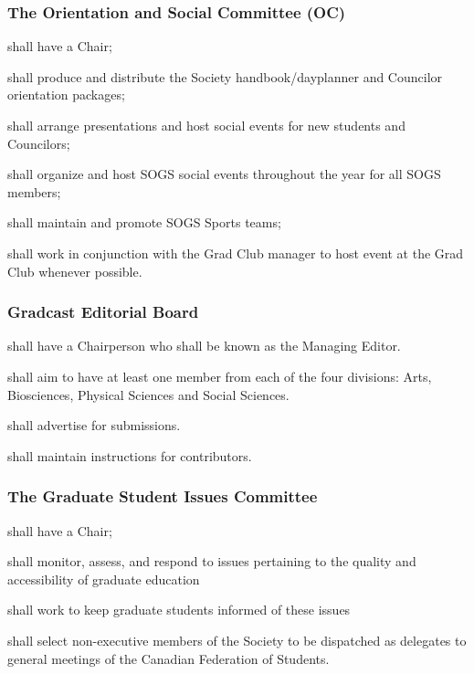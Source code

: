 \subsubsection{The Orientation and Social Committee (OC)}
\begin{longenum}[ label*=\thesubsubsection.\arabic*., align=left]
	\item shall have a Chair;
    \item shall produce and distribute the Society handbook/dayplanner and Councilor orientation packages;
    \item shall arrange presentations and host social events for new students and Councilors;
    \item shall organize and host SOGS social events throughout the year for all SOGS members;
    \item shall maintain and promote SOGS Sports teams;
    \item shall work in conjunction with the Grad Club manager to host event at the Grad Club whenever possible.
\end{longenum}
 
\subsubsection{Gradcast  Editorial Board}
\begin{longenum}[ label*=\thesubsubsection.\arabic*., align=left]
	\item  shall have a Chairperson who shall be known as the Managing Editor.
    \item shall aim to have at least one member from each of the four divisions: Arts, Biosciences, Physical Sciences and Social Sciences.
    \item shall advertise for submissions. 
    \item shall maintain instructions for contributors.
\end{longenum}
 
\subsubsection{The Graduate Student Issues Committee}
\begin{longenum}[ label*=\thesubsubsection.\arabic*., align=left]
	\item shall have a Chair;
    \item shall monitor,  assess, and respond to issues pertaining to the quality and accessibility of graduate education
    \item shall work to keep graduate students informed of these issues
    \item shall select non-executive members of the Society to be dispatched as delegates to general meetings of the Canadian Federation of Students.
\end{longenum}

